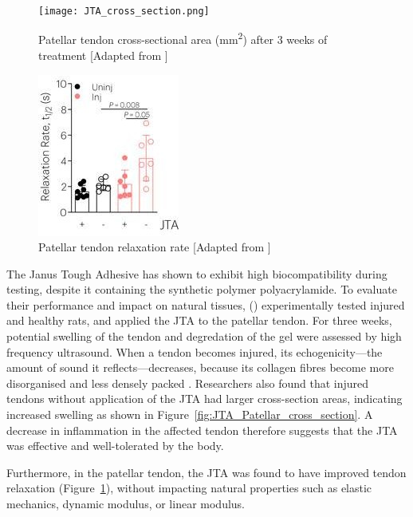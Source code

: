 \begin{figure}[ht]
    \centering
    \begin{minipage}[b]{0.45\textwidth}
        \centering
        \texttt{[image: JTA\_cross\_section.png]}
        \caption{Patellar tendon cross-sectional area (mm\textsuperscript{2}) after 3 weeks of treatment [Adapted from \cite{freedmanEnhancedTendonHealing2022}]}
        \label{fig:JTA_Patellar_cross_section}
    \end{minipage}
    \hfill
    \begin{minipage}[b]{0.45\textwidth}
        \centering
        \includegraphics[width=0.6\linewidth]{Figures/JTA_relaxation_patellar.jpeg}
        \caption{Patellar tendon relaxation rate [Adapted from \cite{freedmanEnhancedTendonHealing2022}]}
        \label{fig:JTA_Patellar_relaxation}
    \end{minipage}
\end{figure}

The Janus Tough Adhesive has shown to exhibit high biocompatibility during testing, despite it containing the synthetic polymer polyacrylamide. To evaluate their performance and impact on natural tissues, \citeauthor{freedmanEnhancedTendonHealing2022} (\citeyear{freedmanEnhancedTendonHealing2022}) experimentally tested  injured and healthy rats, and applied the JTA to the patellar tendon.
For three weeks, potential swelling of the tendon and degredation of the gel were assessed by high frequency ultrasound. When a tendon becomes injured, its echogenicity---the amount of sound it reflects---decreases, because its collagen fibres become more disorganised and less densely packed \autocite{hodgsonTendonLigamentImaging2012}.
Researchers also found that injured tendons without application of the JTA had larger cross-section areas, indicating increased swelling as shown in Figure~\ref{fig:JTA_Patellar_cross_section}. A decrease in inflammation in the affected tendon therefore suggests that the JTA was effective and well-tolerated by the body.

Furthermore, in the patellar tendon, the JTA was found to have improved tendon relaxation (Figure~\ref{fig:JTA_Patellar_relaxation}), without impacting natural properties such as elastic mechanics, dynamic modulus, or linear modulus.

